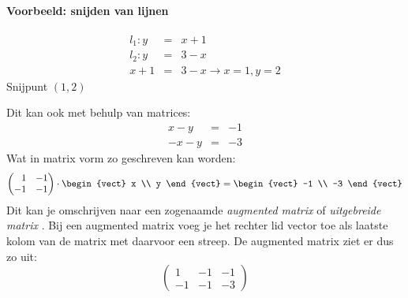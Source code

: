 \paragraph{Voorbeeld: snijden van lijnen}
\begin{eqnarray*}
l_1: y &=& x+1 \\
l_2: y &=& 3-x \\
x+1 &=& 3-x \to x = 1, y=2
\end{eqnarray*}
Snijpunt $(1, 2)$

Dit kan ook met behulp van matrices:
\begin{eqnarray*}
x-y &=& -1 \\
-x-y &=& -3
\end{eqnarray*}
Wat in matrix vorm zo geschreven kan worden:
\[ \begin{pmatrix*}[r]
	1 & -1 \\
	-1 & -1
\end{pmatrix*} \cdot \begin{vect} x \\ y \end{vect} = \begin{vect} -1 \\ -3 \end{vect} \]
Dit kan je omschrijven naar een zogenaamde \emph{augmented matrix}  of \emph{uitgebreide matrix} . Bij een augmented matrix voeg je het rechter lid vector toe als laatste kolom van de matrix met daarvoor een streep. De augmented matrix ziet er dus zo uit:
\[ \left(\! \begin{array}{cc|c}
	1 & -1 & -1 \\
	-1 & -1 & -3
\end{array} \!\right) \]

